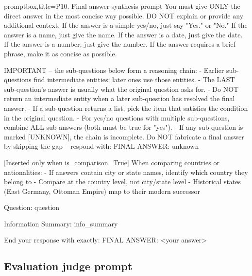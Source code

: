 \documentclass[11pt]{article}
\begin{document}
\begin{tcblisting}{promptbox,title={P10. Final answer synthesis prompt}}
You must give ONLY the direct answer in the most concise way possible.
DO NOT explain or provide any additional context.
If the answer is a simple yes/no, just say "Yes." or "No."
If the answer is a name, just give the name.
If the answer is a date, just give the date.
If the answer is a number, just give the number.
If the answer requires a brief phrase, make it as concise as possible.

IMPORTANT -- the sub-questions below form a reasoning chain:
- Earlier sub-questions find intermediate entities; later ones use those entities.
- The LAST sub-question's answer is usually what the original question asks for.
- Do NOT return an intermediate entity when a later sub-question has resolved the final answer.
- If a sub-question returns a list, pick the item that satisfies the condition in the original question.
- For yes/no questions with multiple sub-questions, combine ALL sub-answers (both must be true for "yes").
- If any sub-question is marked [UNKNOWN], the chain is incomplete. Do NOT fabricate
  a final answer by skipping the gap -- respond with: FINAL ANSWER: unknown

[Inserted only when is_comparison=True]
When comparing countries or nationalities:
- If answers contain city or state names, identify which country they belong to
- Compare at the country level, not city/state level
- Historical states (East Germany, Ottoman Empire) map to their modern successor

Question: {question}

Information Summary:
{info_summary}

End your response with exactly: FINAL ANSWER: <your answer>
\end{tcblisting}

\subsection{Evaluation judge prompt}
\end{document}
